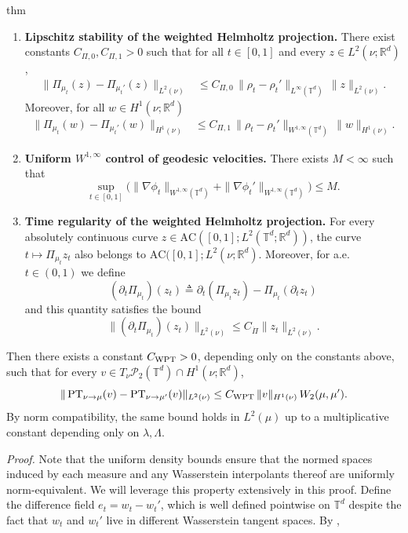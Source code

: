 \documentclass[11pt]{article}
\newcommand{\PT}{\operatorname{PT}}
\begin{document}
\begin{restatable}{thm}{}
\begin{enumerate}
    \item \textbf{Lipschitz stability of the weighted Helmholtz projection.} There exist constants
    $C_{\Pi,0}, C_{\Pi,1}>0$ such that for all $t\in[0,1]$ and every
    $z\in L^2(\nu;\mathbb R^d)$,
    \begin{align*}
    \|\Pi_{\mu_t}(z)-\Pi_{\mu_t'}(z)\|_{L^2(\nu)}
    &\le
    C_{\Pi,0}\,\|\rho_t-\rho_t'\|_{L^\infty(\mathbb{T}^d)}\,\|z\|_{L^2(\nu)}.
    \end{align*}
    Moreover, for all $w \in H^1(\nu; \mathbb{R}^d)$
    \begin{align*}
        \|\Pi_{\mu_t}(w)-\Pi_{\mu_t'}(w)\|_{H^1(\nu)}
    &\le
    C_{\Pi,1}\,\|\rho_t-\rho_t'\|_{W^{1,\infty}(\mathbb{T}^d)}\,\|w\|_{H^1(\nu)}.
    \end{align*}
    \item \textbf{Uniform $W^{1,\infty}$ control of geodesic velocities.} There exists $M<\infty$ such that
    \[
    \sup_{t\in[0,1]}\Big(
    \|\nabla\phi_t\|_{W^{1,\infty}(\mathbb{T}^d)}
    +
    \|\nabla\phi_t'\|_{W^{1,\infty}(\mathbb{T}^d)}
    \Big)\le M.
    \]
    \item \textbf{Time regularity of the weighted Helmholtz projection.}
    For every absolutely continuous curve $z \in \text{AC}([0,1]; L^2(\mathbb{T}^d; \mathbb{R}^d))$, the curve $t \mapsto \Pi_{\mu_t}z_t$ also belongs to $\text{AC}([0,1]; L^2(\nu; \mathbb{R}^d)$. Moreover, for a.e. $t \in (0,1)$ we define
    \[(\partial_t\Pi_{\mu_t})(z_t) \triangleq \partial_t(\Pi_{\mu_t}z_t) - \Pi_{\mu_t}(\partial_tz_t)\]
    and this quantity satisfies the bound 
    \[
    \big\|(\partial_t\Pi_{\mu_t} )(z_t)\big\|_{L^2(\nu)}
    \le C_{\dot\Pi}\|z_t\|_{L^2(\nu)}.
    \]
\end{enumerate}
Then there exists a constant $C_{\rm WPT}>0$, depending only on the constants above, such that for every $v\in T_\nu\mathcal P_2(\mathbb{T}^d)\cap H^1(\nu;\mathbb R^d)$,
\[
\|\PT_{\nu\to\mu}(v)-\PT_{\nu\to\mu'}(v)\|_{L^2(\nu)}
\le
C_{\rm WPT}\,\|v\|_{H^1(\nu)}\,W_2(\mu,\mu').
\]
By norm compatibility, the same bound holds in $L^2(\mu)$ up to a multiplicative constant depending only on $\lambda,\Lambda$.
\end{restatable}
\noindent \textit{Proof.} Note that the uniform density bounds ensure that the normed spaces induced by each measure and any Wasserstein interpolants thereof are uniformly norm-equivalent. We will leverage this property extensively in this proof. Define the difference field $e_t = w_t - w_t'$, which is well defined pointwise on $\mathbb{T}^d$ despite the fact that $w_t$ and $w_t'$ live in different Wasserstein tangent spaces. By , 
\end{document}
